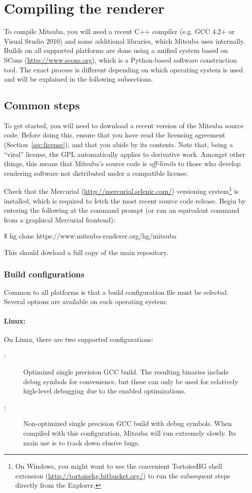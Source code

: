 \section{Compiling the renderer}
\label{sec:compiling}
To compile Mitsuba, you will need a recent C++ compiler (e.g. GCC 4.2+ or 
Visual Studio 2010) and some additional libraries, which Mitsuba uses internally. 
Builds on all supported platforms are done using a unified system
based on SCons (\url{http://www.scons.org}), which is a Python-based 
software construction tool. The exact process is different depending on 
which operating system is used and will be explained in the following subsections.

\subsection{Common steps}
To get started, you will need to download a recent version of the Mitsuba source code. Before
doing this, ensure that you have read the licensing agreement 
(Section~\ref{sec:license}), and that you abide by its contents. Note that, being a ``viral'' 
license, the GPL automatically applies to derivative work. Amongst other things, this
means that Mitsuba's source code is \emph{off-limits} to those who develop rendering
software not distributed under a compatible license.

Check that the Mercurial (\url{http://mercurial.selenic.com/}) versioning 
system\footnote{On Windows, you might want to use the convenient TortoiseHG shell 
extension (\url{http://tortoisehg.bitbucket.org/}) to run the subsequent steps directly from the Explorer.} 
is installed, which is required to fetch the most recent source code release.
Begin by entering the following at the command prompt (or run an equivalent command from a graphical Mercurial frontend):
\begin{shell}
$\texttt{\$}$ hg clone https://www.mitsuba-renderer.org/hg/mitsuba
\end{shell}
This should dowload a full copy of the main repository.

\subsubsection{Build configurations}
Common to all platforms is that a build configuration file must be selected. Several options are
available on each operating system:
\paragraph{Linux:}
On Linux, there are two supported configurations:
\begin{description}
\item[:] Optimized single precision GCC build. The resulting binaries include debug symbols for convenience, but these can only be used for relatively high-level debugging due to the enabled optimizations.
\item[:] Non-optimized single precision GCC build with debug symbols. When compiled with this configuration, Mitsuba
will run extremely slowly. Its main use is to track down elusive bugs.
\end{description}
